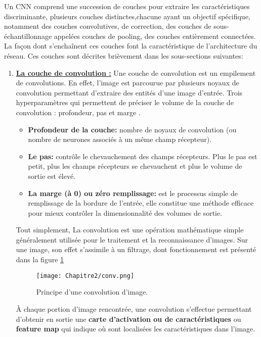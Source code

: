  Un CNN comprend une succession de couches pour extraire les caractéristiques discriminante, plusieurs couches distinctes,chacune ayant un objectif spécifique, notamment  des couches convolutives, de correction,  des couches de sous-échantillonnage appelées couches de pooling, des couches entièrement connectées. La façon dont s'enchaînent ces couches font la caractéristique de l'architecture du réseau. Ces couches sont décrites brièvement dans les sous-sections suivantes:

\begin{enumerate}
\item \underline{\textbf{La couche de convolution :}}
Une couche de convolution est un empilement de convolutions. En effet, l'image est parcourue par plusieurs noyaux de convolution permettant d'extraire des entités d'une image d'entrée. Trois hyperparamètres qui permettent de préciser le volume de la couche de convolution :  profondeur, pas et  marge \cite{CNN2015}.  

\begin{itemize}
\item \textbf{Profondeur de la couche:} nombre de noyaux de convolution (ou nombre de neurones associés à un même champ récepteur).

 \item \textbf{Le pas:} contrôle le chevauchement des champs récepteurs. Plus le pas est petit, plus les champs récepteurs se chevauchent et plus le volume de sortie est élevé.
  
 \item  \textbf{La marge (à 0) ou zéro remplissage:} est le processus simple de remplissage de la bordure de l'entrée, elle constitue une méthode efficace pour mieux contrôler la dimensionnalité des volumes de sortie.

\end{itemize}
Tout simplement, La convolution est une opération mathématique simple généralement utilisée pour le traitement et la reconnaissance d'images. Sur une image, son effet s'assimile à un filtrage,  dont fonctionnement est présenté dans la figure \ref{conv}

\begin{figure}[H]
\centering
\texttt{[image: Chapitre2/conv.png]}
\caption{Principe d'une convolution d'image.}
\label{conv}
\end{figure}

À chaque portion d'image rencontrée, une convolution s'effectue permettant d'obtenir en sortie une \textbf{carte d'activation ou de caractéristiques} ou \textbf{feature map} qui indique où sont localisées les caractéristiques dans l'image. 


\end{enumerate}
